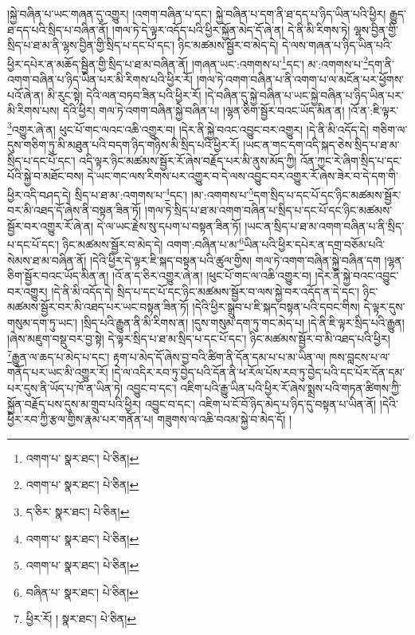 །སྐྱེ་བཞིན་པ་ཡང་གཞན་དུ་འགྱུར། །འགག་བཞིན་པ་དང་། སྐྱེ་བཞིན་པ་དག་ནི་ཐ་དད་པ་ཉིད་ཡིན་པའི་ཕྱིར། རྒྱུད་ཐ་དད་པའི་སྲིད་པ་བཞིན་ནོ། །གལ་ཏེ་དེ་ལྟར་འདོད་པའི་ཕྱིར་སྐྱོན་མེད་དོ་ཞེ་ན། དེ་ནི་མི་རིགས་ཏེ། ལྷས་བྱིན་གྱི་སྲིད་པ་ཐ་མ་ནི་ལྷས་བྱིན་གྱི་སྲིད་པ་དང་པོ་དང་། ཉིང་མཚམས་སྦྱོར་བ་མེད་དེ། དེ་ལས་གཞན་པ་ཉིད་ཡིན་པའི་ཕྱིར་དཔེར་ན་མཆོད་སྦྱིན་གྱི་སྲིད་པ་ཐ་མ་བཞིན་ནོ། །གཞན་ཡང་:འགགས་པ་\footnote{འགག་པ་  སྣར་ཐང་།  པེ་ཅིན། }དང་། མ་:འགགས་པ་\footnote{འགག་པ་  སྣར་ཐང་།  པེ་ཅིན། }དག་ནི་འགག་བཞིན་པ་ཉིད་ཡིན་པར་མི་རིགས་པའི་ཕྱིར་རོ། །གལ་ཏེ་འགག་བཞིན་པ་ནི་འགག་པ་ལ་མངོན་པར་ཕྱོགས་པའོ་ཞེ་ན། མི་རུང་སྟེ། དེའི་ལན་བཏབ་ཟིན་པའི་ཕྱིར་རོ། །དེ་བཞིན་དུ་སྐྱེ་བཞིན་པ་ཡང་སྐྱེ་བཞིན་པ་ཉིད་ཡིན་པར་མི་རིགས་པས། དེའི་ཕྱིར། གལ་ཏེ་འགག་བཞིན་སྐྱེ་བཞིན་པ། །ལྷན་ཅིག་སྦྱོར་བའང་ཡོད་མིན་ན། །འོ་ན་:ཇི་ལྟར་\footnote{ད་ཅིར་  སྣར་ཐང་།  པེ་ཅིན། }འགྱུར་ཞེ་ན། ཕུང་པོ་གང་ལའང་འཆི་འགྱུར་བ། །དེར་ནི་སྐྱེ་བའང་འབྱུང་བར་འགྱུར། །དེ་ནི་མི་འདོད་དེ། གཅིག་ལ་དུས་གཅིག་ཏུ་མི་མཐུན་པའི་བདག་ཉིད་གཉིས་མི་སྲིད་པའི་ཕྱིར་རོ། །ཡང་ན་གང་དག་འདི་སྐད་ཅེས་སྲིད་པ་ཐ་མ་སྲིད་པ་དང་པོ་དང་། འདི་ལྟར་ཉིང་མཚམས་སྦྱོར་རོ་ཞེས་བརྗོད་པར་མི་ནུས་མོད་ཀྱི། འོན་ཀྱང་རེ་ཞིག་སྲིད་པ་དང་པོའི་སྐྱེ་བ་མཐོང་བས། དེ་ཡང་གང་ལས་རིགས་པར་འགྱུར་བ་དེ་ལས་འབྱུང་བར་འགྱུར་རོ་ཞེས་ཟེར་བ་དེ་དག་གི་ཕྱིར་འདི་བཤད་དེ། སྲིད་པ་ཐ་མ་:འགགས་པ་\footnote{འགག་པ་  སྣར་ཐང་།  པེ་ཅིན། }དང་། །མ་:འགགས་པ་\footnote{འགག་པ་  སྣར་ཐང་།  པེ་ཅིན། }དག་སྲིད་པ་དང་པོ་དང་ཉིང་མཚམས་སྦྱོར་བར་མི་འཐད་དོ་ཞེས་ནི་བསྟན་ཟིན་ཏོ། །གལ་ཏེ་སྲིད་པ་ཐ་མ་འགག་བཞིན་པ་སྲིད་པ་དང་པོ་དང་ཉིང་མཚམས་སྦྱོར་བར་འགྱུར་རོ་ཞེ་ན། དེ་ལ་ཡང་རྗེས་སུ་དཔག་པ་བསྟན་ཟིན་ཏོ། །ཡང་ན་སྲིད་པ་ཐ་མ་འགག་བཞིན་པ་ནི་སྲིད་པ་དང་པོ་དང་། ཉིང་མཚམས་སྦྱོར་བ་མེད་དེ། འགག་:བཞིན་པ་མ་\footnote{བཞིན་པ་  སྣར་ཐང་།  པེ་ཅིན། }ཡིན་པའི་ཕྱིར་དཔེར་ན་དགྲ་བཅོམ་པའི་སེམས་ཐ་མ་བཞིན་ནོ། །དེའི་ཕྱིར་དེ་ལྟར་ཇི་སྐད་བསྟན་པའི་ཚུལ་གྱིས། གལ་ཏེ་འགག་བཞིན་སྐྱེ་བཞིན་དག །ལྷན་ཅིག་སྦྱོར་བའང་ཡོད་མིན་ན། །འོ་ན་ད་ཅིར་འགྱུར་ཞེ་ན། །ཕུང་པོ་གང་ལ་འཆི་འགྱུར་བ། །དེར་ནི་སྐྱེ་བའང་འབྱུང་བར་འགྱུར། །དེ་ནི་མི་འདོད་དེ། སྲིད་པ་དང་པོ་དང་ཉིང་མཚམས་སྦྱོར་བ་ལས་སྐྱེ་བར་འདོད་ན་དེ་དང་། ཉིང་མཚམས་སྦྱོར་བར་མི་འཐད་པར་ཡང་བསྟན་ཟིན་ཏོ། །དེའི་ཕྱིར་སྒྲུབ་པ་ཇི་སྐད་བསྟན་པའི་དབང་གིས། དེ་ལྟར་དུས་གསུམ་དག་ཏུ་ཡང་། །སྲིད་པའི་རྒྱུན་ནི་མི་རིགས་ན། །དུས་གསུམ་དག་ཏུ་གང་མེད་པ། །དེ་ནི་ཇི་ལྟར་སྲིད་པའི་རྒྱུན། །ཞེས་མཇུག་བསྡུ་བར་བྱ་སྟེ། དེ་ལྟར་སྲིད་པ་ཐ་མ་སྲིད་པ་དང་པོ་དང་། ཉིང་མཚམས་སྦྱོར་བ་མི་འཐད་པའི་ཕྱིར། \footnote{ཕྱིར་རོ། །   སྣར་ཐང་།  པེ་ཅིན། }རྒྱུན་ལ་ཆད་པ་མེད་པ་དང་། རྟག་པ་མེད་དོ་ཞེས་བྱ་བའི་ཚིག་ནི་དོན་དམ་པ་པ་མ་ཡིན་ལ། ཁས་བླངས་པ་ལ་གནོད་པར་ཡང་མི་འགྱུར་རོ། །དེ་ལ་འདིར་རབ་ཏུ་བྱེད་པའི་དོན་ནི་ཕ་རོལ་པོས་རབ་ཏུ་བྱེད་པའི་དང་པོར་དོན་དམ་པར་དུས་ནི་ཡོད་པ་ཁོ་ན་ཡིན་ཏེ། འབྱུང་བ་དང་། འཇིག་པའི་རྒྱུ་ཡིན་པའི་ཕྱིར་རོ་ཞེས་སྨྲས་པའི་གཏན་ཚིགས་ཀྱི་སྐྱོན་བརྗོད་པས་དུས་མ་གྲུབ་པའི་ཕྱིར། འབྱུང་བ་དང་། འཇིག་པ་ངོ་བོ་ཉིད་མེད་པ་ཉིད་དུ་བསྟན་པ་ཡིན་ནོ། །དེའི་ཕྱིར་རབ་ཀྱི་རྩལ་གྱིས་རྣམ་པར་གནོན་པ། གཟུགས་ལ་འཆི་བའམ་སྐྱེ་བ་མེད་དོ། །
